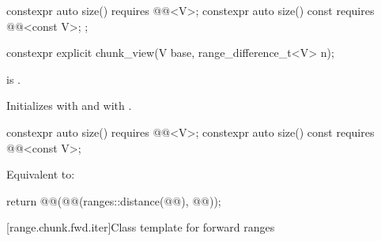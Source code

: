 \begin{codeblock}
{{    constexpr auto size() requires @@<V>;
    constexpr auto size() const requires @@<const V>;
  };
}
\end{codeblock}

\begin{itemdecl}
constexpr explicit chunk_view(V base, range_difference_t<V> n);
\end{itemdecl}

\begin{itemdescr}
\pnum
\expects
{} is .

\pnum
\effects
Initializes  with  and
 with .
\end{itemdescr}

\begin{itemdecl}
constexpr auto size() requires @@<V>;
constexpr auto size() const requires @@<const V>;
\end{itemdecl}

\begin{itemdescr}
\pnum
\effects
Equivalent to:
\begin{codeblock}
return @@(@@(ranges::distance(@@), @@));
\end{codeblock}
\end{itemdescr}

[range.chunk.fwd.iter]{Class template  for forward ranges}

